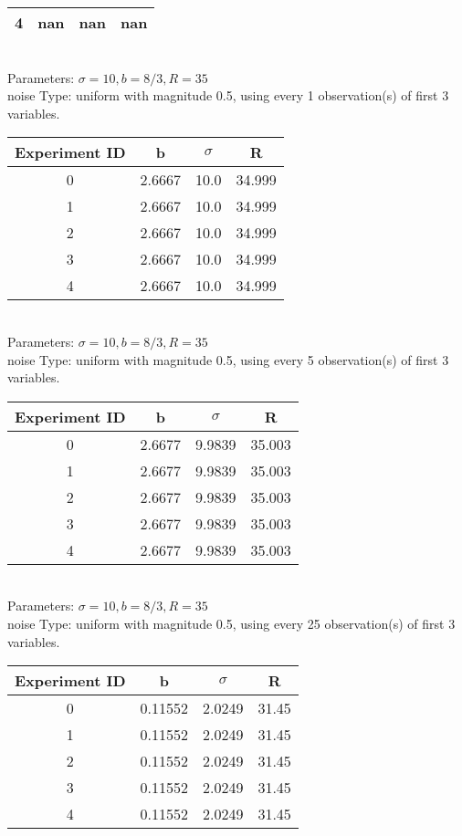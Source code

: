 \begin{multicols}{3}
\begin{tabular}{cccc}
 4 & nan & nan & nan\\ \hline 
 \end{tabular}\\
Parameters: $\sigma=10, b=8/3, R=35$\\
noise Type: uniform with magnitude 0.5, using every 1 observation(s) of first 3 variables.\\
\begin{tabular}{cccc}
\hline Experiment ID & b & $\sigma$ & R \\ \hline 
0 & 2.6667 & 10.0 & 34.999\\ \hline 
 1 & 2.6667 & 10.0 & 34.999\\ \hline 
 2 & 2.6667 & 10.0 & 34.999\\ \hline 
 3 & 2.6667 & 10.0 & 34.999\\ \hline 
 4 & 2.6667 & 10.0 & 34.999\\ \hline 
 \end{tabular}\\
Parameters: $\sigma=10, b=8/3, R=35$\\
noise Type: uniform with magnitude 0.5, using every 5 observation(s) of first 3 variables.\\
\begin{tabular}{cccc}
\hline Experiment ID & b & $\sigma$ & R \\ \hline 
0 & 2.6677 & 9.9839 & 35.003\\ \hline 
 1 & 2.6677 & 9.9839 & 35.003\\ \hline 
 2 & 2.6677 & 9.9839 & 35.003\\ \hline 
 3 & 2.6677 & 9.9839 & 35.003\\ \hline 
 4 & 2.6677 & 9.9839 & 35.003\\ \hline 
 \end{tabular}\\
Parameters: $\sigma=10, b=8/3, R=35$\\
noise Type: uniform with magnitude 0.5, using every 25 observation(s) of first 3 variables.\\
\begin{tabular}{cccc}
\hline Experiment ID & b & $\sigma$ & R \\ \hline 
0 & 0.11552 & 2.0249 & 31.45\\ \hline 
 1 & 0.11552 & 2.0249 & 31.45\\ \hline 
 2 & 0.11552 & 2.0249 & 31.45\\ \hline 
 3 & 0.11552 & 2.0249 & 31.45\\ \hline 
 4 & 0.11552 & 2.0249 & 31.45\\ \hline 

\end{tabular}
\end{multicols}
